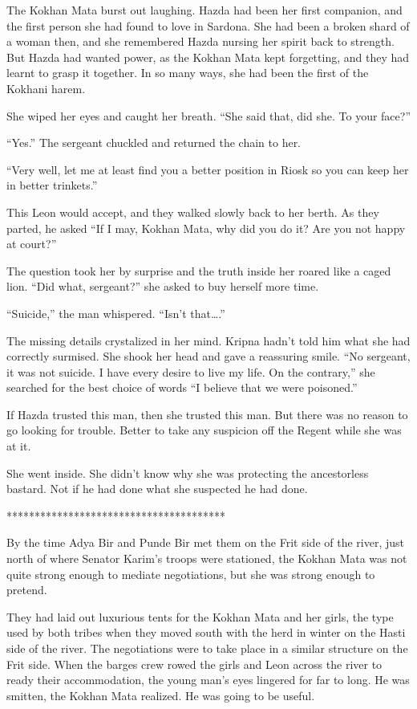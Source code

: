 \documentclass{article}
\begin{document}
	The Kokhan Mata burst out laughing. Hazda had been her first companion, and the first person she had found to love in Sardona. She had been a broken shard of a woman then, and she remembered Hazda nursing her spirit back to strength. But Hazda had wanted power, as the Kokhan Mata kept forgetting, and they had learnt to grasp it together. In so many ways, she had been the first of the Kokhani harem. 
	
	She wiped her eyes and caught her breath. “She said that, did she. To your face?”
	
	“Yes.” The sergeant chuckled and returned the chain to her. 
	
	“Very well, let me at least find you a better position in Riosk so you can keep her in better trinkets.” 
	
	This Leon would accept, and they walked slowly back to her berth. As they parted, he asked “If I may, Kokhan Mata, why did you do it? Are you not happy at court?”
	
	The question took her by surprise and the truth inside her roared like a caged lion. “Did what, sergeant?” she asked to buy herself more time.
	
	“Suicide,” the man whispered. “Isn’t that….”
	
	The missing details crystalized in her mind. Kripna hadn’t told him what she had correctly surmised. She shook her head and gave a reassuring smile. “No sergeant, it was not suicide. I have every desire to live my life. On the contrary,” she searched for the best choice of words “I believe that we were poisoned.” 
	
	If Hazda trusted this man, then she trusted this man. But there was no reason to go looking for trouble. Better to take any suspicion off the Regent while she was at it.
	
	She went inside. She didn’t know why she was protecting the ancestorless bastard. Not if he had done what she suspected he had done.
	
	***************************************
	
	By the time Adya Bir and Punde Bir met them on the Frit side of the river, just north of where Senator Karim’s troops were stationed, the Kokhan Mata was not quite strong enough to mediate negotiations, but she was strong enough to pretend.
	
	They had laid out luxurious tents for the Kokhan Mata and her girls, the type used by both tribes when they moved south with the herd in winter on the Hasti side of the river. The negotiations were to take place in a similar structure on the Frit side. When the barges crew rowed the girls and Leon across the river to ready their accommodation, the young man’s eyes lingered for far to long. He was smitten, the Kokhan Mata realized. He was going to be useful.
	
\end{document}
